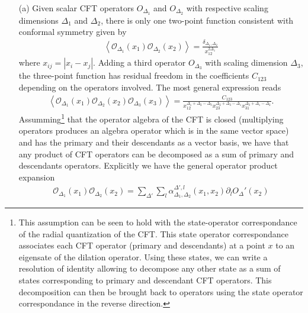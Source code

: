 \documentclass[10pt, a4paper]{article}
\begin{document}
{\begin{enumerate}
  \item[(a)] Given scalar CFT operators $O_{\Delta_1}$ and $O_{\Delta_2}$ with respective scaling dimensions $\Delta_1$ and $\Delta_2$, there is only one two-point function consistent with conformal symmetry given by 
  \begin{align*}
    \left\langle\mathcal{O}_{\Delta_1}(x_1) \mathcal{O}_{\Delta_2}(x_2)\right\rangle=\frac{\delta_{\Delta_1, \Delta_2}}{x^{2 \Delta_1}_{12}}
  \end{align*}
  where $x_{ij} = |x_i - x_j|$. Adding a third operator $O_{\Delta_3}$ with scaling dimension $\Delta_3$, the three-point function has residual freedom in the coefficients $C_{123}$ depending on the operators involved. The most general expression reads 
  \begin{align*}
    \left\langle\mathcal{O}_{\Delta_1}\left(x_1\right) \mathcal{O}_{\Delta_2}\left(x_2\right) \mathcal{O}_{\Delta_3}\left(x_3\right)\right\rangle=\frac{C_{123}}{x_{12}^{\Delta_1+\Delta_2-\Delta_3} x_{23}^{\Delta_2+\Delta_3-\Delta_1} x_{31}^{\Delta_3+\Delta_1-\Delta_2}}.
  \end{align*}
  Assumming\footnote{This assumption can be seen to hold with the state-operator correspondance of the radial quantization of the CFT. This state operator correspondance associates each CFT operator (primary and descendants) at a point $x$ to an eigensate of the dilation operator. Using these states, we can write a resolution of identity allowing to decompose any other state as a sum of states corresponding to primary and descendant CFT operators. This decomposition can then be brought back to operators using the state operator correspondance in the reverse direction.} that the operator algebra of the CFT is closed (multiplying operators produces an algebra operator which is in the same vector space) and has the primary and their descendants as a vector basis, we have that any product of CFT operators can be decomposed as a sum of primary and descendants operators. Explicitly we have the general operator product expansion
  \begin{align*}
    \mathcal{O}_{\Delta_1}\left(x_1\right) \mathcal{O}_{\Delta_2}\left(x_2\right) = \sum_{\Delta'} \sum_l \alpha^{\Delta', l}_{\Delta_1, \Delta_2} (x_{1}, x_{2}) \partial_{l} O_\Delta'(x_2)
  \end{align*}

\end{enumerate}}
\end{document}
